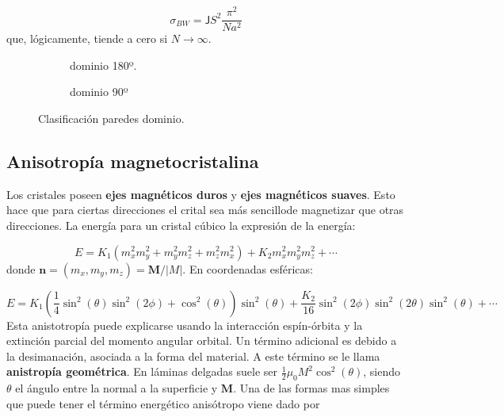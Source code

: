 \documentclass[12pt,a4paper]{book}
\numberwithin{equation}{section}
\numberwithin{figure}{section}
\newcommand{\parentesis}[1]{\left( #1  \right)}
\newcommand{\Jsf}{\mathsf{J}}
\newcommand{\mn}{\mathbf{n}}
\newcommand{\Mn}{\mathbf{M}}
\begin{document}
\begin{equation}
    \sigma_{BW} = \Jsf S^2 \frac{\pi^2}{Na^2}
\end{equation}
que, lógicamente, tiende a cero si $N\rightarrow\infty$. 


\begin{figure}[h!] \centering
\begin{subfigure}[b]{0.45\linewidth} \centering
{}
\caption{dominio 180º.}
\label{Fig:06-07-01-a}
\end{subfigure}
\begin{subfigure}[b]{0.45\linewidth} \centering
{}
\caption{dominio 90º}
\label{Fig:06-07-01-b}
\end{subfigure}
\caption{Clasificación paredes dominio.}
\end{figure}

\subsection{Anisotropía magnetocristalina}

Los cristales poseen \textbf{ejes magnéticos duros} y \textbf{ejes magnéticos suaves}. Esto hace que para ciertas direcciones el crital sea más sencillode magnetizar que otras direcciones. La energía para un cristal cúbico la expresión de la energía:

\begin{equation}
    E = K_1 (m_x^2 m_y^2 + m_y^2 m_z^2 + m_z^2 m_x^2) + K_2 m_x^2 m_y^2 m_z^2 + \cdots
\end{equation}
donde $\mn =(m_x,m_y,m_z)=\Mn / | M |$. En coordenadas esféricas:

\begin{equation}
    E = K_1 \parentesis{\frac{1}{4}\sin^2(\theta) \sin^2(2 \phi) + \cos ^2 (\theta) } \sin^2(\theta) + \frac{K_2}{16} \sin^2(2 \phi) \sin^2(2\theta) \sin^2(\theta) + \cdots
\end{equation}
Esta anistotropía puede explicarse usando la interacción espín-órbita y la extinción parcial del momento angular orbital. Un término adicional es debido a la desimanación, asociada a la forma del material. A este término se le llama \textbf{anistropía geométrica}. En láminas delgadas suele ser $\frac{1}{2} \mu_0 M^2 \cos^2(\theta)$, siendo $\theta$ el ángulo entre la normal a la superficie y $\Mn$. Una de las formas mas simples que puede tener el término energético anisótropo viene dado por
\end{document}
